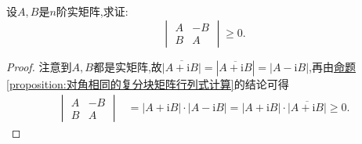 \documentclass[../../main.tex]{subfiles}
\begin{document}
\begin{example}
设\(A,B\)是\(n\)阶实矩阵,求证:
\[
\begin{vmatrix}
A & -B\\
B & A
\end{vmatrix}\geq0.
\]
\end{example}
\begin{proof}
注意到\(A,B\)都是实矩阵,故\(\overline{|A + \mathrm{i}B|}=|\overline{A + \mathrm{i}B}|=|A - \mathrm{i}B|\),再由\hyperref[proposition:对角相同的复分块矩阵行列式计算]{命题\ref{proposition:对角相同的复分块矩阵行列式计算}}的结论可得
\begin{align*}
\begin{vmatrix}
A & -B\\
B & A
\end{vmatrix}&=|A + \mathrm{i}B|\cdot|A - \mathrm{i}B|=|A + \mathrm{i}B|\cdot\overline{|A + \mathrm{i}B|}\geq0.
\end{align*}
\end{proof}
\end{document}

